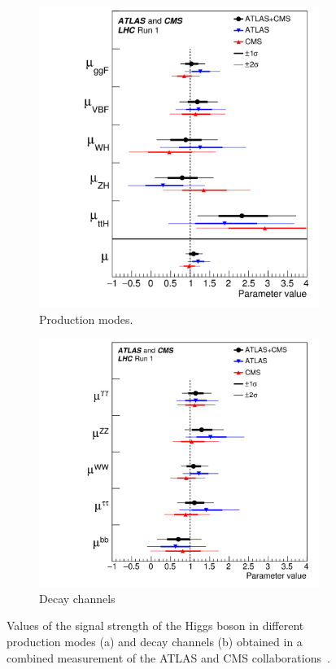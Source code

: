 \begin{figure}[htb]
    \centering
    \begin{subfigure}[c]{0.45\textwidth}
        \includegraphics[width=\textwidth]{./figures/theory/signal_strength_production.png}
        \caption{Production modes.}
    \end{subfigure}
    \begin{subfigure}[c]{0.45\textwidth}
        \includegraphics[width=\textwidth]{./figures/theory/signal_strength_decay.png}
        \caption{Decay channels}
    \end{subfigure}
    \caption{Values of the signal strength of the Higgs boson in different production modes (a) and decay channels (b)
             obtained in a combined measurement of the ATLAS and CMS collaborations~\cite{HiggsMuCombined}.}\label{fig:theory:meas:run1:mu}
\end{figure}


